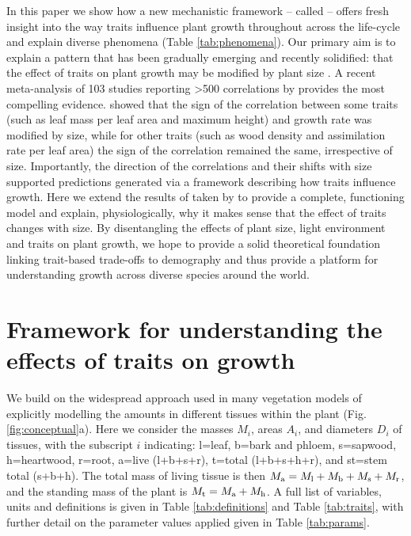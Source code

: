 \documentclass[a4paper,11pt]{article}
\begin{document}
In this paper we show how a new mechanistic framework -- called {\plant} \citep{Falster-2016} -- offers fresh insight into the way traits influence plant growth throughout across the life-cycle and explain diverse phenomena (Table \ref{tab:phenomena}). Our primary aim is to explain a pattern that has been gradually emerging and recently solidified: that the effect of traits on plant growth may be modified by plant size \citep{Ruger-2012, Iida-2014, Gibert-2016}. A recent meta-analysis of 103 studies reporting \textgreater 500 correlations by \citet{Gibert-2016} provides the most compelling evidence. \citet{Gibert-2016} showed that the sign of the correlation between some traits (such as leaf mass per leaf area and maximum height) and growth rate was modified by size, while for other traits (such as wood density and assimilation rate per leaf area) the sign of the correlation remained the same, irrespective of size. Importantly, the direction of the correlations and their shifts with size supported predictions generated via a framework describing how traits influence growth. Here we extend the results of taken by \citet{Gibert-2016} to provide a complete, functioning model and explain, physiologically, why it makes sense that the effect of traits changes with size. By disentangling the effects of plant size, light environment and traits on plant growth, we hope to provide a solid theoretical foundation linking trait-based trade-offs to demography and thus provide a platform for understanding growth across diverse species around the world.

\section{Framework for understanding the effects of traits on growth}

We build on the widespread approach used in many vegetation models of explicitly modelling the amounts in different tissues within the plant \citep[e.g.][]{Givnish-1988, Makela-1997, Moorcroft-2001, Sitch-2008, Falster-2011, King-2011, DeKauwe-2014} (Fig. \ref{fig:conceptual}a). Here we consider the masses $M_i$, areas $A_i$, and diameters $D_i$ of tissues, with the subscript $i$ indicating: l=leaf, b=bark and phloem, s=sapwood, h=heartwood, r=root, a=live (l+b+s+r), t=total (l+b+s+h+r), and st=stem total (s+b+h). The total mass of living tissue is then $M_{\rm a}=M_{\rm l}+M_{\rm b}+M_{\rm s}+M_{\rm r}$, and the standing mass of the plant is $M_{\rm t}=M_{\rm a}+M_{\rm h}$. A full list of variables, units and definitions is given in Table \ref{tab:definitions} and Table \ref{tab:traits}, with further detail on the parameter values applied given in Table \ref{tab:params}.
\end{document}
